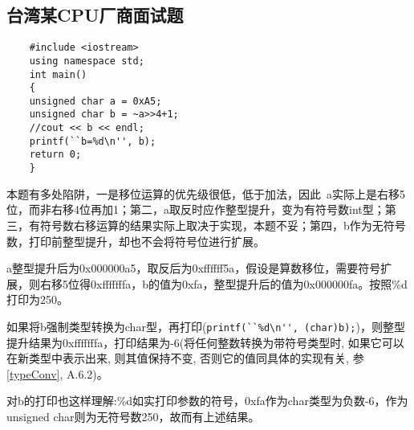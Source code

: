 \subsection{台湾某CPU厂商面试题}
\begin{lstlisting}
    #include <iostream>
    using namespace std;
    int main()
    {
	unsigned char a = 0xA5;
	unsigned char b = ~a>>4+1;
	//cout << b << endl;
	printf(``b=%d\n'', b);
	return 0;
    }
\end{lstlisting}

本题有多处陷阱，一是移位运算的优先级很低，低于加法，因此~a实际上是右移5位，而非右移4位再加1；第二，a取反时应作整型提升，变为有符号数int型；第三，有符号数右移运算的结果实际上取决于实现，本题不妥；第四，b作为无符号数，打印前整型提升，却也不会将符号位进行扩展。

a整型提升后为0x000000a5，取反后为0xffffff5a，假设是算数移位，需要符号扩展，则右移5位得0xfffffffa，b的值为0xfa，整型提升后的值为0x000000fa。按照\%d打印为250。


如果将b强制类型转换为char型，再打印(\lstinline!printf(``%d\n'', (char)b);!)，则整型提升结果为0xfffffffa，打印结果为-6(将任何整数转换为带符号类型时, 如果它可以在新类型中表示出来, 则其值保持不变, 否则它的值同具体的实现有关, 参\cite{self}\ref{typeConv}, \cite{krc}A.6.2)。 

对b的打印也这样理解:\%d如实打印参数的符号，0xfa作为char类型为负数-6，作为unsigned char则为无符号数250，故而有上述结果。













